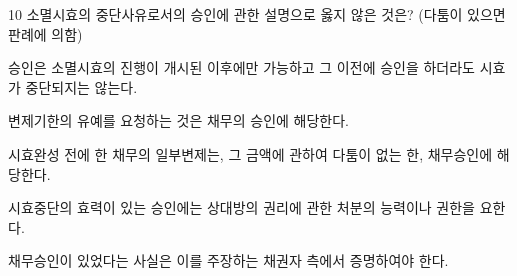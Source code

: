 \begin{question}{10}
소멸시효의 중단사유로서의 승인에 관한 설명으로 옳지 않은 것은? (다툼이 있으면 판례에 의함)
\begin{choices}
  \item 승인은 소멸시효의 진행이 개시된 이후에만 가능하고 그 이전에 승인을 하더라도 시효가 중단되지는 않는다.
  \item 변제기한의 유예를 요청하는 것은 채무의 승인에 해당한다.
  \item 시효완성 전에 한 채무의 일부변제는, 그 금액에 관하여 다툼이 없는 한, 채무승인에 해당한다.
  \item 시효중단의 효력이 있는 승인에는 상대방의 권리에 관한 처분의 능력이나 권한을 요한다.
  \item 채무승인이 있었다는 사실은 이를 주장하는 채권자 측에서 증명하여야 한다.
\end{choices}
\end{question}

